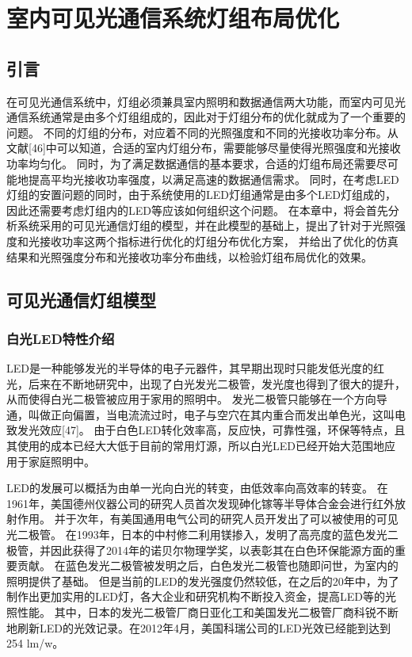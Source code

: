 
\chapter{室内可见光通信系统灯组布局优化}\label{chap:led-layout}
\section{引言}
在可见光通信系统中，灯组必须兼具室内照明和数据通信两大功能，而室内可见光通信系统通常是由多个灯组组成的，因此对于灯组分布的优化就成为了一个重要的问题。
不同的灯组的分布，对应着不同的光照强度和不同的光接收功率分布。从文献[46]中可以知道，合适的室内灯组分布，需要能够尽量使得光照强度和光接收功率均匀化。
同时，为了满足数据通信的基本要求，合适的灯组布局还需要尽可能地提高平均光接收功率强度，以满足高速的数据通信需求。
同时，在考虑LED灯组的安置问题的同时，由于系统使用的LED灯组通常是由多个LED灯组成的，因此还需要考虑灯组内的LED等应该如何组织这个问题。
在本章中，将会首先分析系统采用的可见光通信灯组的模型，并在此模型的基础上，提出了针对于光照强度和光接收功率这两个指标进行优化的灯组分布优化方案，
并给出了优化的仿真结果和光照强度分布和光接收功率分布曲线，以检验灯组布局优化的效果。

\section{可见光通信灯组模型}\label{sec:led-model}
\subsection{白光LED特性介绍}
LED是一种能够发光的半导体的电子元器件，其早期出现时只能发低光度的红光，后来在不断地研究中，出现了白光发光二极管，发光度也得到了很大的提升，从而使得白光二极管被应用于家用的照明中。
发光二极管只能够在一个方向导通，叫做正向偏置，当电流流过时，电子与空穴在其内重合而发出单色光，这叫电致发光效应[47]。
由于白色LED转化效率高，反应快，可靠性强，环保等特点，且其使用的成本已经大大低于目前的常用灯源，所以白光LED已经开始大范围地应用于家庭照明中。

LED的发展可以概括为由单一光向白光的转变，由低效率向高效率的转变。
在1961年，美国德州仪器公司的研究人员首次发现砷化镓等半导体合金会进行红外放射作用。
并于次年，有美国通用电气公司的研究人员开发出了可以被使用的可见光二极管。
在1993年，日本的中村修二利用镁掺入，发明了高亮度的蓝色发光二极管，并因此获得了2014年的诺贝尔物理学奖，以表彰其在白色环保能源方面的重要贡献。
在蓝色发光二极管被发明之后，白色发光二极管也随即问世，为室内的照明提供了基础。
但是当前的LED的发光强度仍然较低，在之后的20年中，为了制作出更加实用的LED灯，各大企业和研究机构不断投入资金，提高LED等的光照性能。
其中，日本的发光二极管厂商日亚化工和美国发光二极管厂商科锐不断地刷新LED的光效记录。在2012年4月，美国科瑞公司的LED光效已经能到达到254 lm/w。

